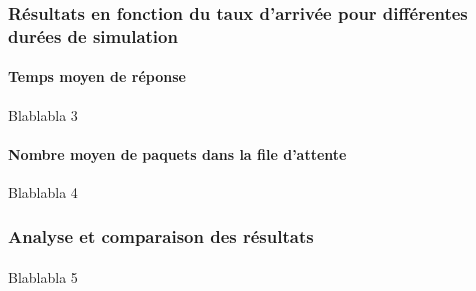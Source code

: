            \subsubsection{Résultats en fonction du taux d'arrivée pour différentes durées de simulation}
%
%
                \paragraph{Temps moyen de réponse}
Blablabla 3
%
                \paragraph{Nombre moyen de paquets dans la file d'attente}
Blablabla 4
%
            \subsubsection{Analyse et comparaison des résultats}
%
                \paragraph{}
Blablabla 5
%
    \clearpage
%
